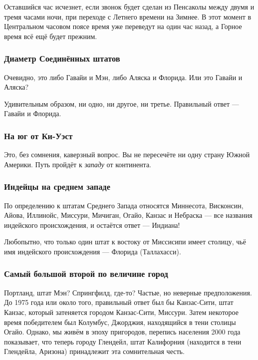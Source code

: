 Оставшийся час исчезнет, если звонок будет сделан из Пенсаколы между двумя и тремя часами ночи, при переходе с Летнего времени на Зимнее.
В этот момент в Центральном часовом поясе время уже переведут на один час назад, а Горное время всё ещё будет прежним.\heart 

       
                                  
\subsubsection*{Диаметр Соединённых штатов}%

Очевидно, это либо Гавайи и Мэн, либо Аляска и Флорида.
Или это Гавайи и Аляска?

\medskip

Удивительным образом, ни одно, ни другое, ни третье.
Правильный ответ --- Гавайи и Флорида.\heart

\subsubsection*{На юг от Ки-Уэст}%

Это, без сомнения, каверзный вопрос. %
Вы не пересечёте ни одну страну Южной Америки.
Путь пройдёт к \emph{западу} от континента.
\heart

\subsubsection*{Индейцы на среднем западе}%

По определению к штатам Среднего Запада относятся Миннесота, Висконсин, Айова,
Иллинойс, Миссури, Мичиган, Огайо, Канзас и Небраска --- все названия индейского
происхождения, и остаётся ответ --- Индиана!\heart

Любопытно, что только один штат к востоку от Миссисипи имеет столицу, чьё имя индейского происхождения --- Флорида (Таллахасси).

\subsubsection*{Самый большой второй по величине город}%

Портланд, штат Мэн? Спрингфилд, где-то? 
Частые, но неверные предположения.
До 1975 года или около того, правильный ответ был бы Канзас-Сити, штат Канзас, который затеняется городом Канзас-Сити, Миссури.
Затем некоторое время победителем был Колумбус, Джорджия, находящийся в тени столицы Огайо.
Однако, мы живём в эпоху пригородов, %
перепись населения 2000 года показывает, что теперь городу Глендейл, штат Калифорния (находится в тени Глендейла, Аризона) принадлежит эта сомнительная %
честь.\heart

